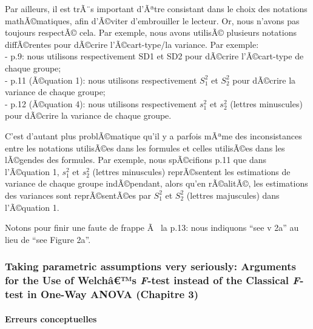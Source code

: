 \begin{appendix}
Par ailleurs, il est trÃ¨s important d'Ãªtre consistant dans le choix
des notations mathÃ©matiques, afin d'Ã©viter d'embrouiller le lecteur.
Or, nous n'avons pas toujours respectÃ© cela. Par exemple, nous avons
utilisÃ© plusieurs notations diffÃ©rentes pour dÃ©crire l'Ã©cart-type/la
variance. Par exemple:\\
- p.9: nous utilisons respectivement SD1 et SD2 pour dÃ©crire
l'Ã©cart-type de chaque groupe;\\
- p.11 (Ã©quation 1): nous utilisons respectivement \(S^2_1\) et
\(S^2_2\) pour dÃ©crire la variance de chaque groupe;\\
- p.12 (Ã©quation 4): nous utilisons respectivement \(s^2_1\) et
\(s^2_2\) (lettres minuscules) pour dÃ©crire la variance de chaque
groupe.

C'est d'autant plus problÃ©matique qu'il y a parfois mÃªme des
inconsistances entre les notations utilisÃ©es dans les formules et
celles utilisÃ©es dans les lÃ©gendes des formules. Par exemple, nous
spÃ©cifions p.11 que dans l'Ã©quation 1, \(s^2_1\) et \(s^2_2\) (lettres
minuscules) reprÃ©sentent les estimations de variance de chaque groupe
indÃ©pendant, alors qu'en rÃ©alitÃ©, les estimations des variances sont
reprÃ©sentÃ©es par \(S^2_1\) et \(S^2_2\) (lettres majuscules) dans
l'Ã©quation 1.

Notons pour finir une faute de frappe Ã~ la p.13: nous indiquons ``see v
2a'' au lieu de ``see Figure 2a''.

\hypertarget{taking-parametric-assumptions-very-seriously-arguments-for-the-use-of-welchuxe2s-f-test-instead-of-the-classical-f-test-in-one-way-anova-chapitre-3}{%
\subsubsection{\texorpdfstring{Taking parametric assumptions very
seriously: Arguments for the Use of Welchâ€™s \emph{F}-test instead of
the Classical \emph{F}-test in One-Way ANOVA (Chapitre
3)}{Taking parametric assumptions very seriously: Arguments for the Use of Welchâ€™s F-test instead of the Classical F-test in One-Way ANOVA (Chapitre 3)}}\label{taking-parametric-assumptions-very-seriously-arguments-for-the-use-of-welchuxe2s-f-test-instead-of-the-classical-f-test-in-one-way-anova-chapitre-3}}

\hypertarget{erreurs-conceptuelles-1}{%
\paragraph{Erreurs conceptuelles}\label{erreurs-conceptuelles-1}}


\end{appendix}
